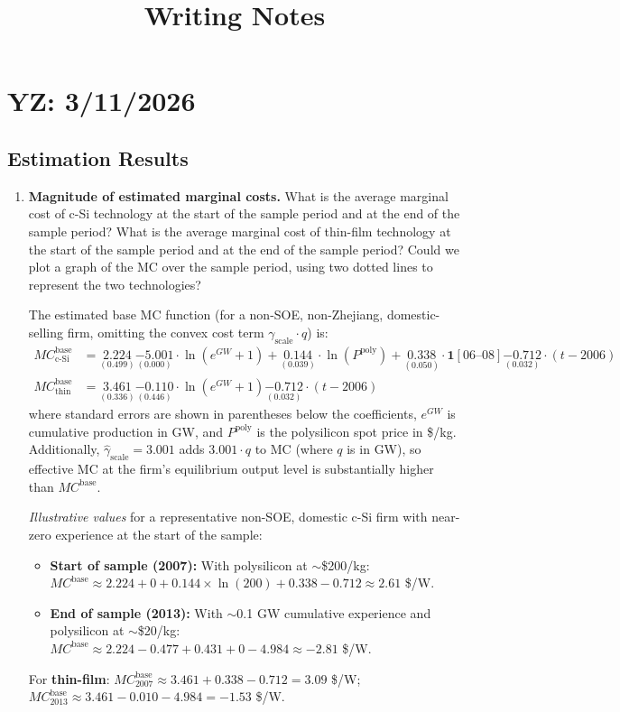 \documentclass[12pt]{article}
\begin{document}
\title{Writing Notes}
 \date{}
\maketitle
\section{YZ: 3/11/2026}

\subsection{Estimation Results}
\begin{enumerate}
    \item \textbf{Magnitude of estimated marginal costs.} 
    What is the average marginal cost of c-Si technology at the start of the sample period and at the end of the sample period? What is the average marginal cost of thin-film technology at the start of the sample period and at the end of the sample period? Could we plot a graph of the MC over the sample period, using two dotted lines to represent the two technologies?
    
    {\color{answerblue}
    The estimated base MC function (for a non-SOE, non-Zhejiang, domestic-selling firm, omitting the convex cost term $\gamma_{\text{scale}} \cdot q$) is:
    \begin{align*}
    MC^{\text{base}}_{\text{c-Si}} &= \underset{(0.499)}{2.224} \underset{(0.000)}{- 5.001} \cdot \ln(e^{GW}+1) + \underset{(0.039)}{0.144} \cdot \ln(P^{\text{poly}}) + \underset{(0.050)}{0.338} \cdot \mathbf{1}[06\text{--}08] \underset{(0.032)}{- 0.712} \cdot (t-2006) \\
    MC^{\text{base}}_{\text{thin}} &= \underset{(0.336)}{3.461} \underset{(0.446)}{- 0.110} \cdot \ln(e^{GW}+1) \underset{(0.032)}{- 0.712} \cdot (t-2006)
    \end{align*}
    where standard errors are shown in parentheses below the coefficients, $e^{GW}$ is cumulative production in GW, and $P^{\text{poly}}$ is the polysilicon spot price in \$/kg. Additionally, $\hat{\gamma}_{\text{scale}} = 3.001$ adds $3.001 \cdot q$ to MC (where $q$ is in GW), so effective MC at the firm's equilibrium output level is substantially higher than $MC^{\text{base}}$.

    \medskip
    \textit{Illustrative values} for a representative non-SOE, domestic c-Si firm with near-zero experience at the start of the sample:
    \begin{itemize}[leftmargin=2em]
        \item \textbf{Start of sample (2007):} With polysilicon at $\sim$\$200/kg:
        $MC^{\text{base}} \approx 2.224 + 0 + 0.144 \times \ln(200) + 0.338 - 0.712 \approx 2.61$ \$/W.
        \item \textbf{End of sample (2013):} With $\sim$0.1 GW cumulative experience and polysilicon at $\sim$\$20/kg:
        $MC^{\text{base}} \approx 2.224 - 0.477 + 0.431 + 0 - 4.984 \approx -2.81$ \$/W.
    \end{itemize}
    For \textbf{thin-film}: $MC^{\text{base}}_{2007} \approx 3.461 + 0.338 - 0.712 = 3.09$ \$/W; $MC^{\text{base}}_{2013} \approx 3.461 - 0.010 - 4.984 = -1.53$ \$/W.

}
\end{enumerate}
\end{document}
